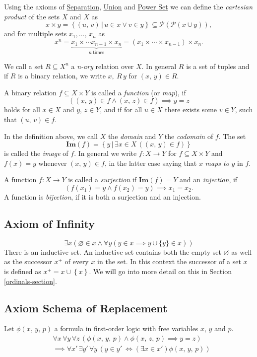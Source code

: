 \documentclass[../../main.tex]{subfiles}
\begin{document}
Using the axioms of \hyperref[ZF3]{Separation}, \hyperref[ZF5]{Union} and \hyperref[ZF6]{Power Set} we can define the \textit{cartesian product} of the sets $X$ and $X$ as
$$x \times y = \left\{(u,\, v) \,\vert\, u \in x \vee v \in y\right\} \subseteq \mathcal{P}\left(\mathcal{P}\left(x \cup y\right)\right),$$
and for multiple sets $x_1,\ldots,\, x_n$ as
$$x^n = \underbrace{x_1 \times \cdots x_{n-1} \times x_n}_{n\ \text{times}}  = \left(x_1 \times \cdots \times x_{n-1}\right) \times x_n.$$

We call a set $R \subseteq X^n$ a \textit{n-ary} relation over $X$.
In general $R$ is a set of tuples and if $R$ is a binary relation, we write $x,\ R\, y$ for $(x,\, y) \in R$.

A binary relation $f \subseteq X \times Y$ is called a \textit{function} (or \textit{map}), if
$$\left((x,\, y) \in f \wedge (x,\, z) \in f\right) \implies y = z$$
holds for all $x \in X$ and $y,\, z \in Y$, and if for all $u \in X$ there exists some $v \in Y$, such that $(u,\, v) \in f$.

In the definition above, we call $X$ the \textit{domain} and $Y$ the \textit{codomain} of $f$.
The set
$$\mathbf{Im}(f) = \left\{y \,\vert\, \exists x \in X \, \left((x,\, y) \in f\right)\right\}$$
is called the \textit{image} of $f$. 
In general we write $f: X \to Y$ for $f \subseteq X \times Y$ and $f(x) = y$ whenever $(x,\, y) \in f$, in the latter case saying that $x$ \textit{maps to} $y$ in $f$.

A function $f: X \to Y$ is called a \textit{surjection} if $\mathbf{Im}(f) = Y$
and an \textit{injection}, if $$\left(f(x_1) = y \wedge f(x_2) = y\right) \implies x_1 = x_2.$$ 
A function is \textit{bijection}, if it is both a surjection and an injection. \cite[pp.7-10]{Jec78}

\subsection{Axiom of Infinity} \label{ZF7}
$$\exists x \left(\varnothing \in x \wedge \forall y \left(y \in x \implies y \cup \{y\} \in x \right)\right)$$
There is an inductive set.
An inductive set contains both the empty set $\varnothing$ as well as the successor $x^+$ of every $x$ in the set.
In this context the successor of a set $x$ is defined as $x^+ = x \cup \left\{x\right\}$.
We will go into more detail on this in Section \ref{ordinals-section}.

\subsection{Axiom Schema of Replacement}
Let $\phi(x,\, y,\, p)$ a formula in first-order logic with free variables $x$, $y$ and $p$.
\begin{align}\label{replacement-axiom}
    &\forall x\, \forall y\, \forall z\, \left(\phi(x,\, y,\, p) \wedge \phi(x,\, z,\, p) \implies y = z\right)\nonumber \\
    &\implies \forall x'\, \exists y'\, \forall y\, \left(y \in y'\ \iff \left(\exists x \in x'\right) \phi(x,\, y,\, p)\right)
\end{align}
\end{document}
